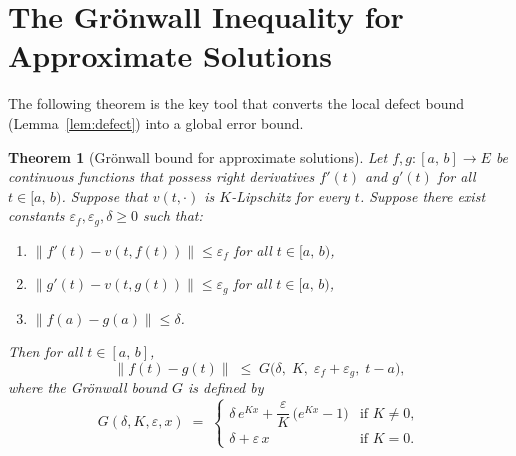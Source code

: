 \documentclass[11pt,a4paper]{article}
\newtheorem{theorem}{Theorem}[section]
\theoremstyle{definition}
\newcommand{\norm}[1]{\lVert #1 \rVert}
\newcommand{\Icc}[2]{[#1,\, #2]}
\newcommand{\Ico}[2]{[#1,\, #2)}
\begin{document}
\section{The Gr\"onwall Inequality for Approximate Solutions}
\label{sec:gronwall}

The following theorem is the key tool that converts the local
defect bound (Lemma~\ref{lem:defect}) into a global error bound.

\begin{theorem}[Gr\"onwall bound for approximate solutions]
\label{thm:gronwall-approx}
Let $f, g \colon \Icc{a}{b} \to E$ be continuous functions that
possess right derivatives $f'(t)$ and $g'(t)$ for all
$t \in \Ico{a}{b}$. Suppose that $v(t, \cdot)$ is $K$-Lipschitz
for every $t$. Suppose there exist constants
$\varepsilon_f, \varepsilon_g, \delta \ge 0$ such that:
\begin{enumerate}[label=(\alph*)]
  \item $\norm{f'(t) - v(t, f(t))} \le \varepsilon_f$
    for all $t \in \Ico{a}{b}$,
  \item $\norm{g'(t) - v(t, g(t))} \le \varepsilon_g$
    for all $t \in \Ico{a}{b}$,
  \item $\norm{f(a) - g(a)} \le \delta$.
\end{enumerate}
Then for all $t \in \Icc{a}{b}$,
\begin{equation}\label{eq:gronwall-bound}
  \norm{f(t) - g(t)}
  \;\le\; G\bigl(\delta,\; K,\; \varepsilon_f + \varepsilon_g,\;
                    t - a\bigr),
\end{equation}
where the \emph{Gr\"onwall bound} $G$ is defined by
\begin{equation}\label{eq:gronwall-def}
  G(\delta, K, \varepsilon, x) \;=\;
  \begin{cases}
    \delta\,e^{Kx} + \dfrac{\varepsilon}{K}\,\bigl(e^{Kx} - 1\bigr)
    & \text{if } K \neq 0, \\[6pt]
    \delta + \varepsilon\,x
    & \text{if } K = 0.
  \end{cases}
\end{equation}
\end{theorem}
\end{document}
